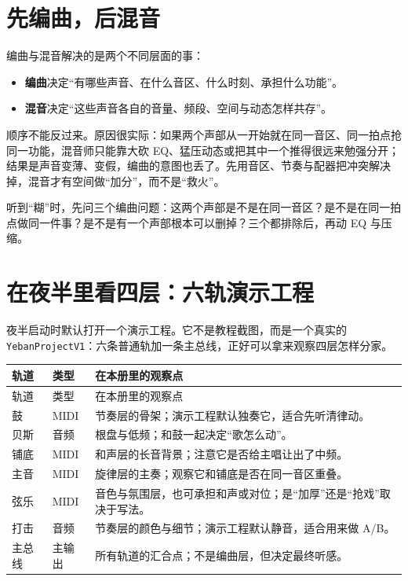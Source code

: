 \section{先编曲，后混音}
\label{sec:arrangement-before-mixing}

编曲与混音解决的是两个不同层面的事：

\begin{itemize}
\item \textbf{编曲}决定“有哪些声音、在什么音区、什么时刻、承担什么功能”。
\item \textbf{混音}决定“这些声音各自的音量、频段、空间与动态怎样共存”。
\end{itemize}

顺序不能反过来。原因很实际：如果两个声部从一开始就在同一音区、同一拍点抢同一功能，混音师只能靠大砍 EQ、猛压动态或把其中一个推得很远来勉强分开；结果是声音变薄、变假，编曲的意图也丢了。先用音区、节奏与配器把冲突解决掉，混音才有空间做“加分”，而不是“救火”。

\begin{warnbox}
听到“糊”时，先问三个编曲问题：这两个声部是不是在同一音区？是不是在同一拍点做同一件事？是不是有一个声部根本可以删掉？三个都排除后，再动 EQ 与压缩。
\end{warnbox}

\section{在夜半里看四层：六轨演示工程}
\label{sec:yeban-demo}

夜半启动时默认打开一个演示工程。它不是教程截图，而是一个真实的 \texttt{Yeban\allowbreak ProjectV1}：六条普通轨加一条主总线，正好可以拿来观察四层怎样分家。

\begin{longtable}{p{}p{}p{}}
\toprule
轨道 & 类型 & 在本册里的观察点 \\
\midrule
\endfirsthead
\toprule
轨道 & 类型 & 在本册里的观察点 \\
\midrule
\endhead
鼓 & MIDI & 节奏层的骨架；演示工程默认独奏它，适合先听清律动。 \\
贝斯 & 音频 & 根盘与低频；和鼓一起决定“歌怎么动”。 \\
铺底 & MIDI & 和声层的长音背景；注意它是否给主唱让出了中频。 \\
主音 & MIDI & 旋律层的主奏；观察它和铺底是否在同一音区重叠。 \\
弦乐 & MIDI & 音色与氛围层，也可承担和声或对位；是“加厚”还是“抢戏”取决于写法。 \\
打击 & 音频 & 节奏层的颜色与细节；演示工程默认静音，适合用来做 A/B。 \\
主总线 & 主输出 & 所有轨道的汇合点；不是编曲层，但决定最终听感。 \\
\bottomrule
\end{longtable}

